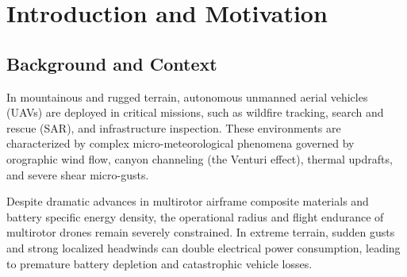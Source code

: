 \documentclass[12pt,a4paper,oneside]{report}
\begin{document}
\newpage
\tableofcontents
\newpage
\listoffigures
\newpage
\listoftables

\cleardoublepage
{}
\setcounter{page}{1}

\chapter{Introduction and Motivation}

\section{Background and Context}
In mountainous and rugged terrain, autonomous unmanned aerial vehicles (UAVs) are deployed in critical missions, such as wildfire tracking, search and rescue (SAR), and infrastructure inspection. These environments are characterized by complex micro-meteorological phenomena governed by orographic wind flow, canyon channeling (the Venturi effect), thermal updrafts, and severe shear micro-gusts. 

Despite dramatic advances in multirotor airframe composite materials and battery specific energy density, the operational radius and flight endurance of multirotor drones remain severely constrained. In extreme terrain, sudden gusts and strong localized headwinds can double electrical power consumption, leading to premature battery depletion and catastrophic vehicle losses.
\end{document}
